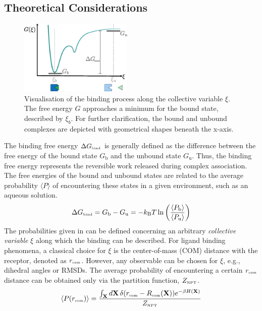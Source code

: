 \documentclass[9pt,tutorial]{livecoms}
\begin{document}
\subsection*{Theoretical Considerations}
\begin{figure}[H]
    \centering
    \includegraphics[width=0.48\textwidth]{figures/GofXiAnnotated.png}
    \caption{Visualisation of the binding process along the collective variable $\xi$. The free energy $G$ approaches a minimum for the bound state, described by $\xi_b$. For further clarification, the bound and unbound complexes are depicted with geometrical shapes beneath the x-axis.}
    \label{fig:GofXiAnnotated}
\end{figure}
The binding free energy $\Delta G_\text{\tiny bind}$ is generally defined as the difference between the free energy of the bound state $G_\text{b}$ and the unbound state $G_\text{u}$. Thus, the binding free energy represents the reversible work released during complex association. The free energies of the bound and unbound states are related to the average probability $\langle P \rangle$ of encountering these states in a given environment, such as an aqueous solution.\cite{Woo_2005}
\begin{align}\label{eq:deltaGbind}
    \Delta G_\text{\tiny bind} = G_\text{b} - G_\text{u}  =  -k_\text{B} T \ln\left(\frac{\langle P_\text{b} \rangle}{\langle P_\text{u} \rangle} \right)
\end{align}
The probabilities given in  can be defined concerning an arbitrary \textit{collective variable} $\xi$ along which the binding can be described. For ligand binding phenomena, a classical choice for $\xi$ is the center-of-mass (COM) distance with the receptor, denoted as $r_\text{\tiny com}$. However, any observable can be chosen for $\xi$, e.g., dihedral angles or RMSDs. The average probability of encountering a certain $r_\text{\tiny com}$ distance can be obtained only via the partition function, $Z_\text{\tiny NPT}$.
\begin{align}\label{eq:PofRcom}
    \langle P(r_\text{\tiny com}) \rangle = \frac{\int_\mathbf{X} d\mathbf{X} \, \delta(r_\text{\tiny com} - R_\text{\tiny com}(\mathbf{X})) e^{ -\beta H(\mathbf{X}) }} {Z_\text{\tiny NPT}}
\end{align}
\end{document}
